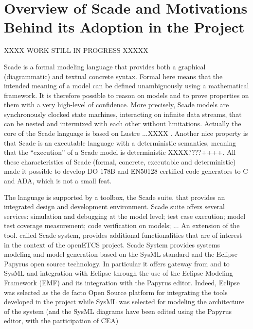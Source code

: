 \documentclass{template/openetcs_report}
\begin{document}

\section{Overview of Scade and Motivations Behind its Adoption in the
  Project}

XXXX WORK STILL IN PROGRESS XXXXX


Scade is a formal modeling language that provides both a graphical
(diagrammatic) and textual concrete syntax. Formal here means that the
intended meaning of a model can be defined unambiguously using a
mathematical framework. It is therefore possible to reason on models
and to prove properties on them with a very high-level of
confidence. More precisely, Scade models are synchronously clocked
state machines, interacting on infinite data streams, that can be
nested and intermixed with each other without limitations. Actually
the core of the Scade language is based on Lustre ...XXXX . Another
nice property is that Scade is an executable language with a
deterministic semantics, meaning that the ``execution'' of a Scade
model is deterministic XXXX????++++.  All these characteristics of
Scade (formal, concrete, executable and deterministic) made it
possible to develop DO-178B and EN50128 certified code generators to C
and ADA, which is not a small feat.

The language is supported by a toolbox, the Scade suite, that provides
an integrated design and development environment. Scade suite offers
several services: simulation and debugging at the model level; test
case execution; model test coverage measurement; code verification on
models; ... An extension of the tool. called Scade system, provides
additional functionalities that are of interest in the context of the
openETCS project.  Scade System provides systems modeling and model
generation based on the SysML standard and the Eclipse Papyrus open
source technology. In particular it offers gateway from and to SysML
and integration with Eclipse through the use of the Eclipse Modeling
Framework (EMF) and its integration with the Papyrus editor. Indeed,
Eclipse was selected as the de facto Open Source platform for
integrating the tools developed in the project while SysML was
selected for modeling the architecture of the system (and the SysML
diagrams have been edited using the Papyrus editor, with the
participation of CEA)
\end{document}
